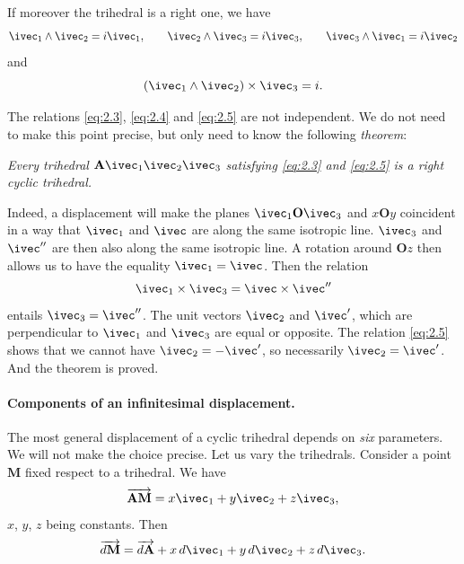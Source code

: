 If moreover the trihedral is a right one, we have
\begin{equation}
  \label{eq:2.4}
  \ivec_{1}\wedge\ivec_{2}=i\ivec_{1},\qquad\ivec_{2}\wedge\ivec_{3}=i\ivec_{3},\qquad\ivec_{3}\wedge\ivec_{1}=i\ivec_{2}
\end{equation}
and
\begin{equation}
  \label{eq:2.5}
  (\ivec_{1}\wedge\ivec_{2})\times\ivec_{3}=i.
\end{equation}

The relations \eqref{eq:2.3}, \eqref{eq:2.4} and \eqref{eq:2.5} are not independent. We do not need to make this point precise, but only need to know the following \emph{theorem}:

\somespace

\emph{Every trihedral $\mathbf{A}\ivec_{1}\ivec_{2}\ivec_{3}$ satisfying \eqref{eq:2.3} and \eqref{eq:2.5} is a right cyclic trihedral.}

\somespace

Indeed, a displacement will make the planes $\ivec_{1}\mathbf{O}\ivec_{3}$ and $x\mathbf{O}y$ coincident in a way that $\ivec_{1}$ and $\ivec$ are along the same isotropic line. $\ivec_{3}$ and $\ivec''$ are then also along the same isotropic line. A rotation around $\mathbf{O}z$ then allows us to have the equality $\ivec_{1}=\ivec$. Then the relation
\[
\ivec_{1}\times\ivec_{3}=\ivec\times\ivec''
\]
entails $\ivec_{3}=\ivec''$. The unit vectors $\ivec_{2}$ and $\ivec'$, which are perpendicular to $\ivec_{1}$ and $\ivec_{3}$ are equal or opposite. The relation \eqref{eq:2.5} shows that we cannot have $\ivec_{2}=-\ivec'$, so necessarily $\ivec_{2}=\ivec'$. And the theorem is proved.

\paragraph{Components of an infinitesimal displacement.}
\label{sec:24}
The most general displacement of a cyclic trihedral depends on \emph{six} parameters. We will not make the choice precise. Let us vary the trihedrals. Consider a point $\mathbf{M}$ fixed respect to a trihedral. We have
\[
\overrightarrow{\mathbf{AM}}=x\ivec_{1}+y\ivec_{2}+z\ivec_{3},
\]
$x$, $y$, $z$ being constants. Then
\[
\overrightarrow{d\mathbf{M}}=\overrightarrow{d\mathbf{A}}+x\,d\ivec_{1}+y\,d\ivec_{2}+z\,d\ivec_{3}.
\]

